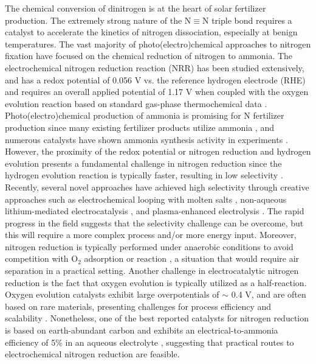 The chemical conversion of dinitrogen is at the heart of solar fertilizer production. The extremely strong nature of the N$\equiv$N triple bond requires a catalyst to accelerate the kinetics of nitrogen dissociation, especially at benign temperatures. The vast majority of photo(electro)chemical approaches to nitrogen fixation have focused on the chemical reduction of nitrogen to ammonia. The electrochemical nitrogen reduction reaction (NRR) has been studied extensively, and has a redox potential of 0.056 V vs. the reference hydrogen electrode (RHE) and requires an overall applied potential of 1.17 V when coupled with the oxygen evolution reaction based on standard gas-phase thermochemical data \cite{Medford_2017, Chen_2018}. Photo(electro)chemical production of ammonia is promising for N fertilizer production since many existing fertilizer products utilize ammonia  \cite{Waller_2016}, and numerous catalysts have shown ammonia synthesis activity in experiments \cite{McPherson_2019, Medford_2017}. However, the proximity of the redox potential or nitrogen reduction and hydrogen evolution presents a fundamental challenge in nitrogen reduction since the hydrogen evolution reaction is typically faster, resulting in low selectivity \cite{Skulason_2012,Singh_2017}. Recently, several novel approaches have achieved high selectivity through creative approaches such as electrochemical looping with molten salts \cite{McEnaney_2017}, non-aqueous lithium-mediated electrocatalysis \cite{Lazouski_2019}, and plasma-enhanced electrolysis \cite{Hawtof_2019}. The rapid progress in the field suggests that the selectivity challenge can be overcome, but this will require a more complex process and/or more energy input. Moreover, nitrogen reduction is typically performed under anaerobic conditions to avoid competition with O$_2$ adsorption or reaction \cite{Hirakawa_2017}, a situation that would require air separation in a practical setting. Another challenge in electrocatalytic nitrogen reduction is the fact that oxygen evolution is typically utilized as a half-reaction. Oxygen evolution catalysts exhibit large overpotentials of $\sim$ 0.4 V, and are often based on rare materials, presenting challenges for process efficiency and scalability \cite{Jiao_2015, Seh_2017}. Nonetheless, one of the best reported catalysts for nitrogen reduction is based on earth-abundant carbon and exhibits an electrical-to-ammonia efficiency of 5\% in an aqueous electrolyte \cite{Song_2018}, suggesting that practical routes to electrochemical nitrogen reduction are feasible.

